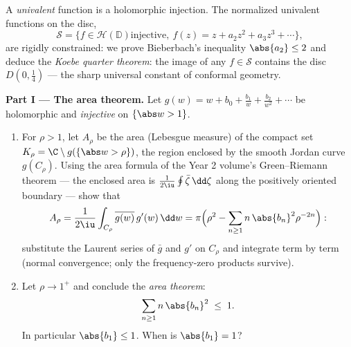 \begin{problem}\label{pb:b3:conformal:1}
A \emph{univalent} function is a holomorphic injection. The
normalized univalent functions on the disc,
\[
\mathcal S = \bigl\{f \in \mathcal H(\mathbb D) \text{
injective},\ f(z) = z + a_2z^2 + a_3z^3 + \cdots\bigr\},
\]
are rigidly constrained: we prove Bieberbach's inequality
$\abs{a_2} \leq 2$ and deduce the \emph{Koebe quarter
theorem}: the image of any $f \in \mathcal S$ contains the
disc $D(0, \frac14)$ --- the sharp universal constant of
conformal geometry.

\medskip
\noindent\textbf{Part I --- The area theorem.} Let $g(w) = w
+ b_0 + \frac{b_1}w + \frac{b_2}{w^2} + \cdots$ be holomorphic
and \emph{injective} on $\{\abs w > 1\}$.
\begin{enumerate}
  \item For $\rho > 1$, let $A_\rho$ be the area (Lebesgue
        measure) of the compact set $K_\rho = \C\setminus
        g(\{\abs w > \rho\})$, the region enclosed by the
        smooth Jordan curve $g(C_\rho)$. Using the area
        formula of the Year 2 volume's Green--Riemann theorem
        --- the enclosed area is $\frac1{2\iu}
        \oint\bar\zeta\,\dd\zeta$ along the positively
        oriented boundary --- show that
        \[
        A_\rho = \frac{1}{2\iu}\int_{C_\rho}
        \overline{g(w)}\,g'(w)\,\dd w
        = \pi\Bigl(\rho^2 -
        \sum_{n\geq1}n\,\abs{b_n}^2\rho^{-2n}\Bigr) :
        \]
        substitute the Laurent series of $\bar g$ and $g'$ on
        $C_\rho$ and integrate term by term (normal
        convergence; only the frequency-zero products
        survive).
  \item Let $\rho \to 1^+$ and conclude the \emph{area
        theorem}:
        \[
        \sum_{n\geq1}n\,\abs{b_n}^2 \;\leq\; 1 .
        \]
        In particular $\abs{b_1} \leq 1$. When is $\abs{b_1}
        = 1$?
\end{enumerate}


\end{problem}
